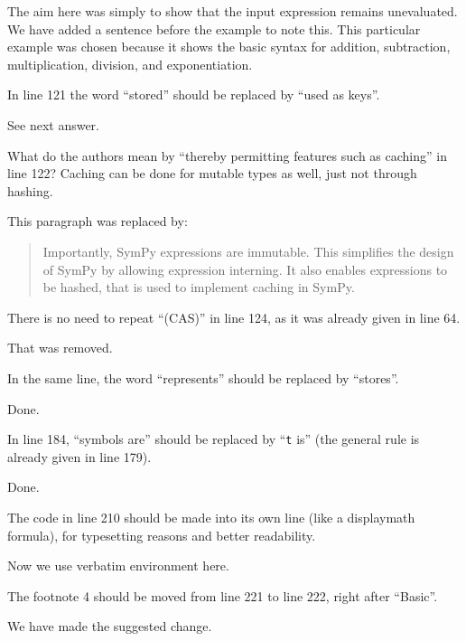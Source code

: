 \documentclass[answers,12pt]{exam}
\begin{document}
\begin{questions}
\begin{solution}
The aim here was simply to show that the input expression remains unevaluated.
We have added a sentence before the example to note this.
This particular example was chosen because it shows the basic syntax for
addition, subtraction, multiplication, division, and exponentiation.
\end{solution}

\question In line 121 the word ``stored'' should be replaced by ``used as keys''.
\begin{solution}
See next answer.
\end{solution}

\question What do the authors mean by ``thereby permitting features such as caching'' in line 122? Caching can be done for mutable types as well, just not through hashing.
\begin{solution}
This paragraph was replaced by:
\begin{quote}
Importantly, SymPy expressions are immutable. This simplifies the design of
SymPy by allowing expression interning. It also enables expressions to be
hashed, that is used to implement caching in SymPy.
\end{quote}
\end{solution}

\question There is no need to repeat ``(CAS)'' in line 124, as it was already given in line 64.
\begin{solution}
That was removed.
\end{solution}

\question In the same line, the word ``represents'' should be replaced by ``stores''.
\begin{solution}
Done.
\end{solution}

\question In line 184, ``symbols are'' should be replaced by ``\texttt{t} is'' (the general rule is already given in line 179).
\begin{solution}
Done.
\end{solution}

\question The code in line 210 should be made into its own line (like a displaymath formula), for typesetting reasons and better readability.
\begin{solution}
Now we use verbatim environment here.
\end{solution}

\question The footnote 4 should be moved from line 221 to line 222, right after ``Basic''.
\label{rev3point16}
\begin{solution}
We have made the suggested change.
\end{solution}


\end{questions}
\end{document}
